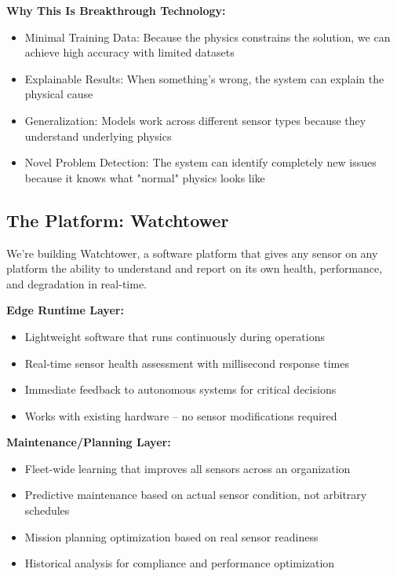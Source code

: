 \documentclass[11pt,letterpaper]{article}
\begin{document}
\textbf{Why This Is Breakthrough Technology:}
\begin{itemize}[leftmargin=10pt, itemsep=1pt]
    \item Minimal Training Data: Because the physics constrains the solution, we can achieve high accuracy with limited datasets
    \item Explainable Results: When something's wrong, the system can explain the physical cause
    \item Generalization: Models work across different sensor types because they understand underlying physics
    \item Novel Problem Detection: The system can identify completely new issues because it knows what "normal" physics looks like
\end{itemize}

\subsection*{The Platform: Watchtower}

We're building Watchtower, a software platform that gives any sensor on any platform the ability to understand and report on its own health, performance, and degradation in real-time.

\textbf{Edge Runtime Layer:}
\begin{itemize}[leftmargin=10pt, itemsep=1pt]
    \item Lightweight software that runs continuously during operations
    \item Real-time sensor health assessment with millisecond response times
    \item Immediate feedback to autonomous systems for critical decisions
    \item Works with existing hardware – no sensor modifications required
\end{itemize}

\textbf{Maintenance/Planning Layer:}
\begin{itemize}[leftmargin=10pt, itemsep=1pt]
    \item Fleet-wide learning that improves all sensors across an organization
    \item Predictive maintenance based on actual sensor condition, not arbitrary schedules
    \item Mission planning optimization based on real sensor readiness
    \item Historical analysis for compliance and performance optimization
\end{itemize}
\end{document}
